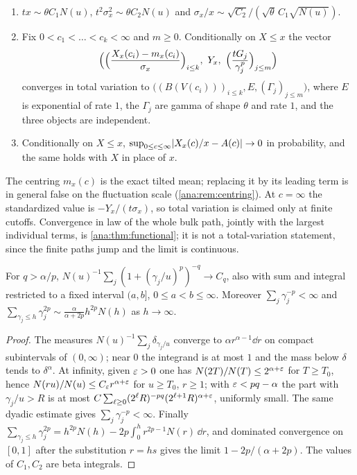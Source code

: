 \begin{theorem}\label{ana:thm:condlaw}
\begin{enumerate}[label=\textup{(\roman*)}]
\item $tx\sim\theta C_1N(u)$, $t^2\sigma_x^2\sim\theta C_2N(u)$ and
 $\sigma_x/x\sim\sqrt{C_2}/(\sqrt\theta\,C_1\sqrt{N(u)})$.
\item Fix $0<c_1<\dots<c_k<\infty$ and $m\ge0$. Conditionally on $X\le x$ the vector
\[
 \Bigl(\Bigl(\frac{X_x(c_i)-m_x(c_i)}{\sigma_x}\Bigr)_{i\le k},\ Y_x,\
 \Bigl(\frac{tG_j}{\gamma_j^p}\Bigr)_{j\le m}\Bigr)
\]
converges in total variation to $\bigl((B(V(c_i)))_{i\le k},E,(\Gamma_j)_{j\le m}\bigr)$, where $E$ is
exponential of rate $1$, the $\Gamma_j$ are gamma of shape $\theta$ and rate $1$, and the three
objects are independent.
\item Conditionally on $X\le x$, $\sup_{0\le c\le\infty}\lvert X_x(c)/x-A(c)\rvert\to0$ in probability, and
the same holds with $X$ in place of $x$.
\end{enumerate}
\end{theorem}

The centring $m_x(c)$ is the exact tilted mean; replacing it by its leading term is in general
false on the fluctuation scale (\cref{ana:rem:centring}). At $c=\infty$ the standardized value is
$-Y_x/(t\sigma_x)$, so total variation is claimed only at finite cutoffs. Convergence in law of the
whole bulk path, jointly with the largest individual terms, is \cref{ana:thm:functional}; it is not a
total-variation statement, since the finite paths jump and the limit is continuous.

\begin{lemma}\label{ana:lem:specsums}
For $q>\alpha/p$, $N(u)^{-1}\sum_j(1+(\gamma_j/u)^p)^{-q}\to C_q$, also with sum and integral restricted
to a fixed interval $(a,b]$, $0\le a<b\le\infty$. Moreover $\sum_j\gamma_j^{-p}<\infty$ and
$\sum_{\gamma_j\le h}\gamma_j^{2p}\sim\frac\alpha{\alpha+2p}h^{2p}N(h)$ as $h\to\infty$.
\end{lemma}

\begin{proof}
The measures $N(u)^{-1}\sum_j\delta_{\gamma_j/u}$ converge to $\alpha r^{\alpha-1}\dd r$ on compact
subintervals of $(0,\infty)$; near $0$ the integrand is at most $1$ and the mass below $\delta$ tends
to $\delta^\alpha$. At infinity, given $\varepsilon>0$ one has $N(2T)/N(T)\le2^{\alpha+\varepsilon}$ for $T\ge T_0$,
hence $N(ru)/N(u)\le C_\varepsilon r^{\alpha+\varepsilon}$ for $u\ge T_0$, $r\ge1$; with $\varepsilon<pq-\alpha$ the part with
$\gamma_j/u>R$ is at most $C\sum_{\ell\ge0}(2^\ell R)^{-pq}(2^{\ell+1}R)^{\alpha+\varepsilon}$, uniformly small.
The same dyadic estimate gives $\sum_j\gamma_j^{-p}<\infty$. Finally
$\sum_{\gamma_j\le h}\gamma_j^{2p}=h^{2p}N(h)-2p\int_0^hr^{2p-1}N(r)\,\dd r$, and dominated convergence on
$[0,1]$ after the substitution $r=hs$ gives the limit $1-2p/(\alpha+2p)$. The values of $C_1,C_2$ are
beta integrals.
\end{proof}

